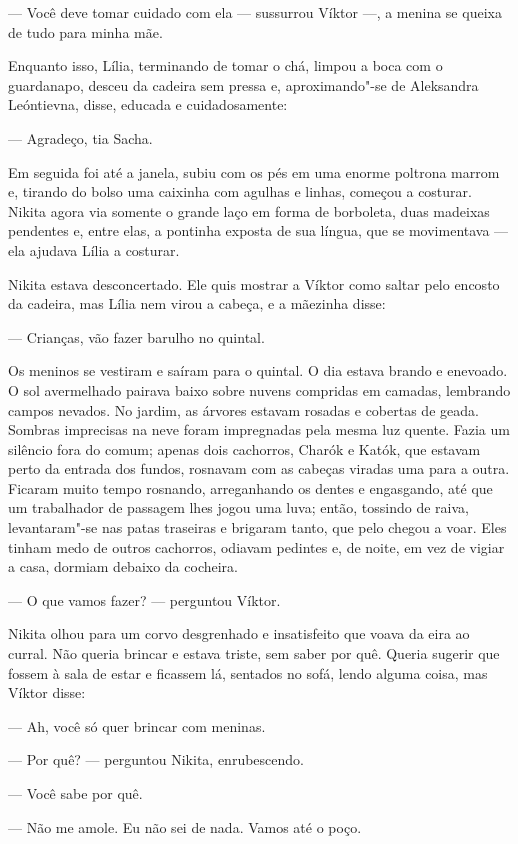 --- Você deve tomar cuidado com ela --- sussurrou Víktor ---, a menina
se queixa de tudo para minha mãe.

Enquanto isso, Lília, terminando de tomar o chá, limpou a boca com o
guardanapo, desceu da cadeira sem pressa e, aproximando"-se de Aleksandra
Leóntievna, disse, educada e cuidadosamente:

--- Agradeço, tia Sacha.

Em seguida foi até a janela, subiu com os pés em uma enorme poltrona
marrom e, tirando do bolso uma caixinha com agulhas e linhas, começou a
costurar. Nikita agora via somente o grande laço em forma de borboleta,
duas madeixas pendentes e, entre elas, a pontinha exposta de sua
língua, que se movimentava --- ela ajudava Lília a costurar.

Nikita estava desconcertado. Ele quis mostrar a Víktor como saltar pelo
encosto da cadeira, mas Lília nem virou a cabeça, e a mãezinha disse:

--- Crianças, vão fazer barulho no quintal.

Os meninos se vestiram e saíram para o quintal. O dia estava brando e
enevoado. O sol avermelhado pairava baixo sobre nuvens compridas em
camadas, lembrando campos nevados. No jardim, as árvores estavam rosadas
e cobertas de geada. Sombras imprecisas na neve foram impregnadas pela
mesma luz quente. Fazia um silêncio fora do comum; apenas dois
cachorros, Charók e Katók, que estavam perto da entrada dos fundos,
rosnavam com as cabeças viradas uma para a outra. Ficaram muito tempo
rosnando, arreganhando os dentes e engasgando, até que um trabalhador de
passagem lhes jogou uma luva; então, tossindo de raiva, levantaram"-se
nas patas traseiras e brigaram tanto, que pelo chegou a voar. Eles tinham
medo de outros cachorros, odiavam pedintes e, de noite, em vez de vigiar
a casa, dormiam debaixo da cocheira.

--- O que vamos fazer? --- perguntou Víktor.

Nikita olhou para um corvo desgrenhado e insatisfeito que voava da eira
ao curral. Não queria brincar e estava triste, sem saber por quê. Queria
sugerir que fossem à sala de estar e ficassem lá, sentados no sofá,
lendo alguma coisa, mas Víktor disse:

--- Ah, você só quer brincar com meninas.

--- Por quê? --- perguntou Nikita, enrubescendo.

--- Você sabe por quê.

--- Não me amole. Eu não sei de nada. Vamos até o poço.

